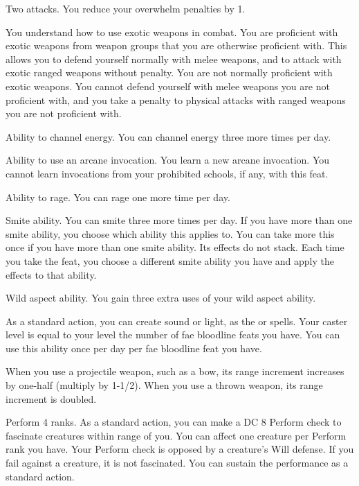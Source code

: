 \featpre Two attacks.
\featben You reduce your overwhelm penalties by 1.

You understand how to use exotic weapons in combat.
\featben You are proficient with exotic weapons from weapon groups that you are otherwise proficient with.
This allows you to defend yourself normally with melee weapons, and to attack with exotic ranged weapons without penalty.
You are not normally proficient with exotic weapons.
You cannot defend yourself with melee weapons you are not proficient with, and you take a  penalty to physical attacks with ranged weapons you are not proficient with.

\featpre Ability to channel energy.
\featben You can channel energy three more times per day.

\featpre Ability to use an arcane invocation.
\featben You learn a new arcane invocation.
You cannot learn invocations from your prohibited schools, if any, with this feat.

\featpre Ability to rage.
\featben You can rage one more time per day.

\featpre Smite ability.
\featben You can smite three more times per day.
If you have more than one smite ability, you choose which ability this applies to.
You can take more this once if you have more than one smite ability.
Its effects do not stack.
Each time you take the feat, you choose a different smite ability you have and apply the effects to that ability.

\featpre Wild aspect ability.
\featben You gain three extra uses of your wild aspect ability.

\featben As a standard action, you can create sound or light, as the 
or 
spells.
Your caster level is equal to your level \add the number of fae bloodline feats you have.
You can use this ability once per day per fae bloodline feat you have.

\featben When you use a projectile weapon, such as a bow, its range increment increases by one-half (multiply by 1-1/2).
When you use a thrown weapon, its range increment is doubled.

\featpre Perform 4 ranks.
\featben As a standard action, you can make a DC 8 Perform check to fascinate creatures within \rngmed range of you.
You can affect one creature per Perform rank you have.
Your Perform check is opposed by a creature's Will defense.
If you fail against a creature, it is not fascinated.
You can sustain the performance as a standard action.


